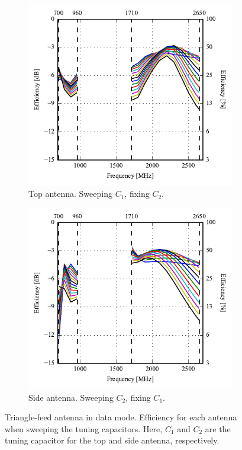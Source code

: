 \begin{figure}[htbp]
    \centering
    \begin{subfigure}{0.49\linewidth}
        \centering
        \includegraphics{img/tech_sol/trianglefeed/data_mode/efficiency-ac1-Csh1.pdf}
        \caption{Top antenna. Sweeping $C_1$, fixing $C_2$.}
    \end{subfigure}
    \hfill
    \begin{subfigure}{0.49\linewidth}
        \centering
        \includegraphics{img/tech_sol/trianglefeed/data_mode/efficiency-ac2-Csh2.pdf}
        \caption{Side antenna. Sweeping $C_2$, fixing $C_1$.}
    \end{subfigure}
    \caption{Triangle-feed antenna in data mode. Efficiency for each antenna when sweeping the tuning capacitors. Here, $C_1$ and $C_2$ are the tuning capacitor for the top and side antenna, respectively.}
    \label{fig:eff_sol2data}
\end{figure}


